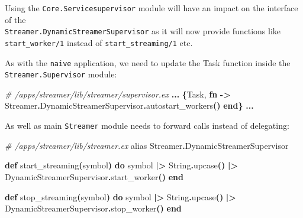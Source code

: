 \documentclass[
  oneside]{book}
\newenvironment{Shaded}{\begin{snugshade}}{\end{snugshade}}
\newcommand{\CommentTok}[1]{\textcolor[rgb]{0.56,0.35,0.01}{\textit{#1}}}
\newcommand{\ConstantTok}[1]{\textcolor[rgb]{0.56,0.35,0.01}{#1}}
\newcommand{\FunctionTok}[1]{\textcolor[rgb]{0.13,0.29,0.53}{\textbf{#1}}}
\newcommand{\ImportTok}[1]{#1}
\newcommand{\KeywordTok}[1]{\textcolor[rgb]{0.13,0.29,0.53}{\textbf{#1}}}
\newcommand{\NormalTok}[1]{#1}
\newcommand{\OperatorTok}[1]{\textcolor[rgb]{0.81,0.36,0.00}{\textbf{#1}}}
\begin{document}
Using the \texttt{Core.Servicesupervisor} module will have an impact on the interface of the\\
\texttt{Streamer.DynamicStreamerSupervisor} as it will now provide functions like \texttt{start\_worker/1} instead of \texttt{start\_streaming/1} etc.

As with the \texttt{naive} application, we need to update the Task function inside the \texttt{Streamer.Supervisor} module:

\begin{Shaded}
\begin{Highlighting}[]
\CommentTok{\# /apps/streamer/lib/streamer/supervisor.ex}
      \OperatorTok{...}
      \FunctionTok{\{}\ConstantTok{Task}\NormalTok{,}
       \KeywordTok{fn} \OperatorTok{{-}\textgreater{}}
         \ConstantTok{Streamer}\OperatorTok{.}\ConstantTok{DynamicStreamerSupervisor}\OperatorTok{.}\NormalTok{autostart\_workers}\FunctionTok{()}
       \KeywordTok{end}\FunctionTok{\}}
      \OperatorTok{...}
\end{Highlighting}
\end{Shaded}

\newpage

As well as main \texttt{Streamer} module needs to forward calls instead of delegating:

\begin{Shaded}
\begin{Highlighting}[]
  \CommentTok{\# /apps/streamer/lib/streamer.ex}
  \ImportTok{alias} \ConstantTok{Streamer}\OperatorTok{.}\ConstantTok{DynamicStreamerSupervisor}

  \KeywordTok{def}\NormalTok{ start\_streaming}\FunctionTok{(}\NormalTok{symbol}\FunctionTok{)} \KeywordTok{do}
\NormalTok{    symbol}
    \OperatorTok{|\textgreater{}} \ConstantTok{String}\OperatorTok{.}\NormalTok{upcase}\FunctionTok{()}
    \OperatorTok{|\textgreater{}} \ConstantTok{DynamicStreamerSupervisor}\OperatorTok{.}\NormalTok{start\_worker}\FunctionTok{()}
  \KeywordTok{end}

  \KeywordTok{def}\NormalTok{ stop\_streaming}\FunctionTok{(}\NormalTok{symbol}\FunctionTok{)} \KeywordTok{do}
\NormalTok{    symbol}
    \OperatorTok{|\textgreater{}} \ConstantTok{String}\OperatorTok{.}\NormalTok{upcase}\FunctionTok{()}
    \OperatorTok{|\textgreater{}} \ConstantTok{DynamicStreamerSupervisor}\OperatorTok{.}\NormalTok{stop\_worker}\FunctionTok{()}
  \KeywordTok{end}
\end{Highlighting}
\end{Shaded}
\end{document}
